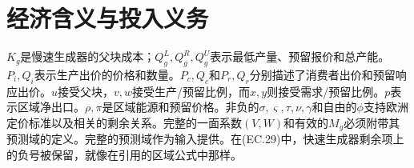 \documentclass{article}
\begin{document}
\section*{经济含义与投入义务}
$K_g$是慢速生成器的父块成本；$Q_g^L,Q_g^R,Q_g^U$表示最低产量、预留报价和总产能。$P_i,Q_i$表示生产出价的价格和数量。$P_c,Q_c$和$P_r,Q_r$分别描述了消费者出价和预留响应出价。$u$接受父块，$v,w$接受生产/预留比例，而$x,y$则接受需求/预留比例。$p$表示区域净出口。$\rho,\pi$是区域能源和预留价格。非负的$\sigma,\varsigma,\tau,\nu,\gamma$和自由的$\phi$支持欧洲定价标准以及相关的剩余关系。完整的一面系数$(V,W)$和有效的$M_g$必须附带其预测域的定义。完整的预测域作为输入提供。在(EC.29)中，快速生成器剩余项上的负号被保留，就像在引用的区域公式中那样。
\end{document}
